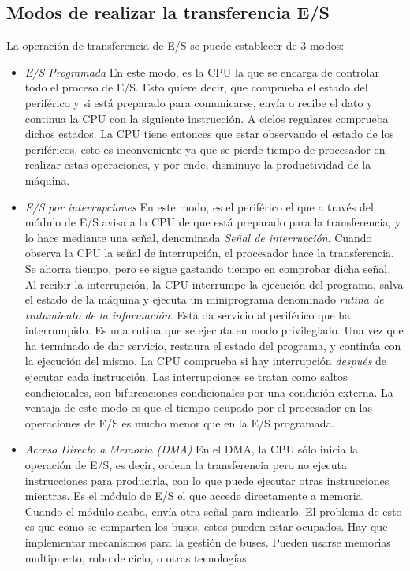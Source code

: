 \documentclass[a4paper,11pt,spanish]{report}
\begin{document}
\subsection{Modos de realizar la transferencia E/S}
La operación de transferencia de E/S se puede establecer de 3 modos:
\begin{itemize}
\item \emph{E/S Programada} En este modo, es la CPU la que se encarga de controlar todo el proceso de E/S. Esto quiere decir, que comprueba el estado del periférico y si está preparado para comunicarse, envía o recibe el dato y continua la CPU con la siguiente instrucción. A ciclos regulares comprueba dichos estados. La CPU tiene entonces que estar observando el estado de los periféricos, esto es inconveniente ya que se pierde tiempo de procesador en realizar estas operaciones, y por ende, disminuye la productividad de la máquina.
\item \emph{E/S por interrupciones} En este modo, es el periférico el que a través del módulo de E/S avisa a la CPU de que está preparado para la transferencia, y lo hace mediante una señal, denominada \emph{Señal de interrupción}. Cuando observa la CPU la señal de interrupción, el procesador hace la transferencia. Se ahorra tiempo, pero se sigue gastando tiempo en comprobar dicha señal. Al recibir la interrupción, la CPU interrumpe la ejecución del programa, salva el estado de la máquina y ejecuta un miniprograma denominado \emph{rutina de tratamiento de la información}. Esta da servicio al periférico que ha interrumpido. Es una rutina que se ejecuta en modo privilegiado. Una vez que ha terminado de dar servicio, restaura el estado del programa, y continúa con la ejecución del mismo. La CPU comprueba si hay interrupción \emph{después} de ejecutar cada instrucción. Las interrupciones se tratan como saltos condicionales, son bifurcaciones condicionales por una condición externa. La ventaja de este modo es que el tiempo ocupado por el procesador en las operaciones de E/S es mucho menor que en la E/S programada.
\item \emph{Acceso Directo a Memoria (DMA)} En el DMA, la CPU sólo inicia la operación de E/S, es decir, ordena la transferencia pero no ejecuta instrucciones para producirla, con lo que puede ejecutar otras instrucciones mientras. Es el módulo de E/S el que accede directamente a memoria. Cuando el módulo acaba, envía otra señal para indicarlo. El problema de esto es que como se comparten los buses, estos pueden estar ocupados. Hay que implementar mecanismos para la gestión de buses. Pueden usarse memorias multipuerto, robo de ciclo, o otras tecnologías.
\end{itemize}
\end{document}
